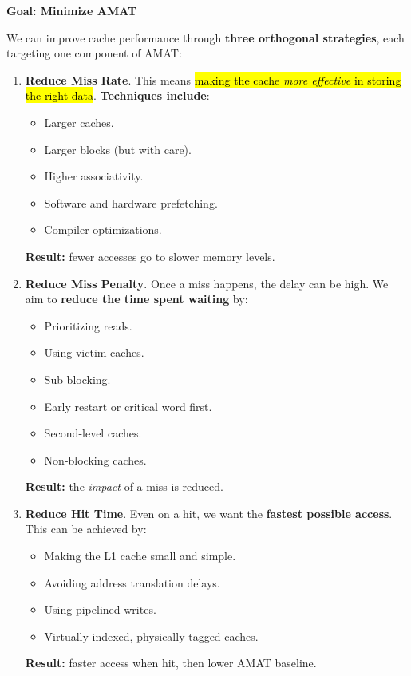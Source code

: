 \highspace
\begin{flushleft}
    \textcolor{Green3}{ \textbf{Goal: Minimize AMAT}}
\end{flushleft}
We can improve cache performance through \textbf{three orthogonal strategies}, each targeting one component of AMAT:
\begin{enumerate}
    \item \textbf{Reduce Miss Rate}. This means \hl{making the cache \emph{more effective} in storing the right data}. \textbf{Techniques include}:
    \begin{itemize}
        \item Larger caches.
        \item Larger blocks (but with care).
        \item Higher associativity.
        \item Software and hardware prefetching.
        \item Compiler optimizations.
    \end{itemize}
    \textcolor{Green3}{ \textbf{Result:}} fewer accesses go to slower memory levels.
    \item \textbf{Reduce Miss Penalty}. Once a miss happens, the delay can be high. We aim to \textbf{reduce the time spent waiting} by:
    \begin{itemize}
        \item Prioritizing reads.
        \item Using victim caches.
        \item Sub-blocking.
        \item Early restart or critical word first.
        \item Second-level caches.
        \item Non-blocking caches.
    \end{itemize}
    \textcolor{Green3}{ \textbf{Result:}} the \emph{impact} of a miss is reduced.
    \item \textbf{Reduce Hit Time}. Even on a hit, we want the \textbf{fastest possible access}. This can be achieved by:
    \begin{itemize}
        \item Making the L1 cache small and simple.
        \item Avoiding address translation delays.
        \item Using pipelined writes.
        \item Virtually-indexed, physically-tagged caches.
    \end{itemize}
    \textcolor{Green3}{ \textbf{Result:}} faster access when hit, then lower AMAT baseline.
\end{enumerate}

